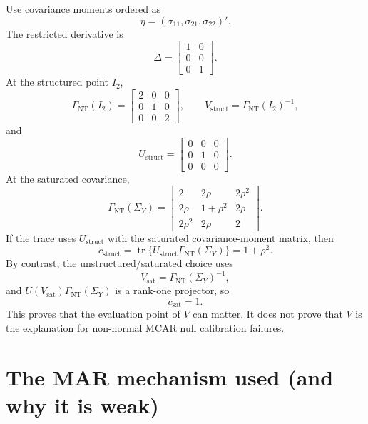 \documentclass[11pt]{article}
\newcommand{\tr}{\operatorname{tr}}
\begin{document}
Use covariance moments ordered as
\[
  \eta = (\sigma_{11},\sigma_{21},\sigma_{22})'.
\]
The restricted derivative is
\[
  \Delta =
  \begin{bmatrix}
    1 & 0 \\
    0 & 0 \\
    0 & 1
  \end{bmatrix}.
\]
At the structured point \(I_2\),
\[
  \Gamma_{\mathrm{NT}}(I_2)
    =
  \begin{bmatrix}
    2 & 0 & 0 \\
    0 & 1 & 0 \\
    0 & 0 & 2
  \end{bmatrix},
  \qquad
  V_{\mathrm{struct}} = \Gamma_{\mathrm{NT}}(I_2)^{-1},
\]
and
\[
  U_{\mathrm{struct}}
    =
  \begin{bmatrix}
    0 & 0 & 0 \\
    0 & 1 & 0 \\
    0 & 0 & 0
  \end{bmatrix}.
\]
At the saturated covariance,
\[
  \Gamma_{\mathrm{NT}}(\Sigma_Y)
    =
  \begin{bmatrix}
    2 & 2\rho & 2\rho^2 \\
    2\rho & 1+\rho^2 & 2\rho \\
    2\rho^2 & 2\rho & 2
  \end{bmatrix}.
\]
If the trace uses \(U_{\mathrm{struct}}\) with the saturated covariance-moment
matrix, then
\[
  c_{\mathrm{struct}}
    =
  \tr\{U_{\mathrm{struct}}\Gamma_{\mathrm{NT}}(\Sigma_Y)\}
    =
  1+\rho^2.
\]
By contrast, the unstructured/saturated choice uses
\[
  V_{\mathrm{sat}}=\Gamma_{\mathrm{NT}}(\Sigma_Y)^{-1},
\]
and \(U(V_{\mathrm{sat}})\Gamma_{\mathrm{NT}}(\Sigma_Y)\) is a rank-one
projector, so
\[
  c_{\mathrm{sat}} = 1.
\]
This proves that the evaluation point of \(V\) can matter. It does not prove
that \(V\) is the explanation for non-normal MCAR null calibration failures.

\section*{The MAR mechanism used (and why it is weak)}
\end{document}
